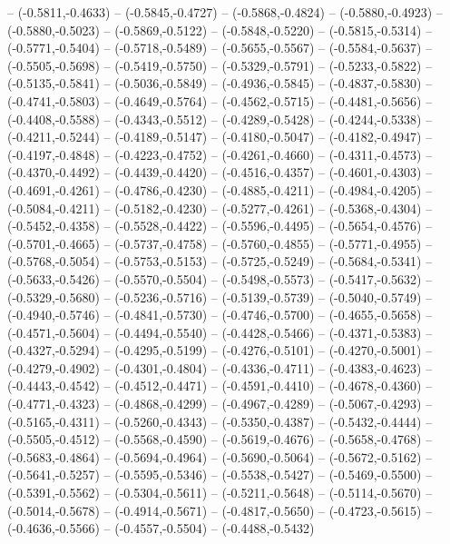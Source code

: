 {	-- (-0.5811,-0.4633)
	-- (-0.5845,-0.4727)
	-- (-0.5868,-0.4824)
	-- (-0.5880,-0.4923)
	-- (-0.5880,-0.5023)
	-- (-0.5869,-0.5122)
	-- (-0.5848,-0.5220)
	-- (-0.5815,-0.5314)
	-- (-0.5771,-0.5404)
	-- (-0.5718,-0.5489)
	-- (-0.5655,-0.5567)
	-- (-0.5584,-0.5637)
	-- (-0.5505,-0.5698)
	-- (-0.5419,-0.5750)
	-- (-0.5329,-0.5791)
	-- (-0.5233,-0.5822)
	-- (-0.5135,-0.5841)
	-- (-0.5036,-0.5849)
	-- (-0.4936,-0.5845)
	-- (-0.4837,-0.5830)
	-- (-0.4741,-0.5803)
	-- (-0.4649,-0.5764)
	-- (-0.4562,-0.5715)
	-- (-0.4481,-0.5656)
	-- (-0.4408,-0.5588)
	-- (-0.4343,-0.5512)
	-- (-0.4289,-0.5428)
	-- (-0.4244,-0.5338)
	-- (-0.4211,-0.5244)
	-- (-0.4189,-0.5147)
	-- (-0.4180,-0.5047)
	-- (-0.4182,-0.4947)
	-- (-0.4197,-0.4848)
	-- (-0.4223,-0.4752)
	-- (-0.4261,-0.4660)
	-- (-0.4311,-0.4573)
	-- (-0.4370,-0.4492)
	-- (-0.4439,-0.4420)
	-- (-0.4516,-0.4357)
	-- (-0.4601,-0.4303)
	-- (-0.4691,-0.4261)
	-- (-0.4786,-0.4230)
	-- (-0.4885,-0.4211)
	-- (-0.4984,-0.4205)
	-- (-0.5084,-0.4211)
	-- (-0.5182,-0.4230)
	-- (-0.5277,-0.4261)
	-- (-0.5368,-0.4304)
	-- (-0.5452,-0.4358)
	-- (-0.5528,-0.4422)
	-- (-0.5596,-0.4495)
	-- (-0.5654,-0.4576)
	-- (-0.5701,-0.4665)
	-- (-0.5737,-0.4758)
	-- (-0.5760,-0.4855)
	-- (-0.5771,-0.4955)
	-- (-0.5768,-0.5054)
	-- (-0.5753,-0.5153)
	-- (-0.5725,-0.5249)
	-- (-0.5684,-0.5341)
	-- (-0.5633,-0.5426)
	-- (-0.5570,-0.5504)
	-- (-0.5498,-0.5573)
	-- (-0.5417,-0.5632)
	-- (-0.5329,-0.5680)
	-- (-0.5236,-0.5716)
	-- (-0.5139,-0.5739)
	-- (-0.5040,-0.5749)
	-- (-0.4940,-0.5746)
	-- (-0.4841,-0.5730)
	-- (-0.4746,-0.5700)
	-- (-0.4655,-0.5658)
	-- (-0.4571,-0.5604)
	-- (-0.4494,-0.5540)
	-- (-0.4428,-0.5466)
	-- (-0.4371,-0.5383)
	-- (-0.4327,-0.5294)
	-- (-0.4295,-0.5199)
	-- (-0.4276,-0.5101)
	-- (-0.4270,-0.5001)
	-- (-0.4279,-0.4902)
	-- (-0.4301,-0.4804)
	-- (-0.4336,-0.4711)
	-- (-0.4383,-0.4623)
	-- (-0.4443,-0.4542)
	-- (-0.4512,-0.4471)
	-- (-0.4591,-0.4410)
	-- (-0.4678,-0.4360)
	-- (-0.4771,-0.4323)
	-- (-0.4868,-0.4299)
	-- (-0.4967,-0.4289)
	-- (-0.5067,-0.4293)
	-- (-0.5165,-0.4311)
	-- (-0.5260,-0.4343)
	-- (-0.5350,-0.4387)
	-- (-0.5432,-0.4444)
	-- (-0.5505,-0.4512)
	-- (-0.5568,-0.4590)
	-- (-0.5619,-0.4676)
	-- (-0.5658,-0.4768)
	-- (-0.5683,-0.4864)
	-- (-0.5694,-0.4964)
	-- (-0.5690,-0.5064)
	-- (-0.5672,-0.5162)
	-- (-0.5641,-0.5257)
	-- (-0.5595,-0.5346)
	-- (-0.5538,-0.5427)
	-- (-0.5469,-0.5500)
	-- (-0.5391,-0.5562)
	-- (-0.5304,-0.5611)
	-- (-0.5211,-0.5648)
	-- (-0.5114,-0.5670)
	-- (-0.5014,-0.5678)
	-- (-0.4914,-0.5671)
	-- (-0.4817,-0.5650)
	-- (-0.4723,-0.5615)
	-- (-0.4636,-0.5566)
	-- (-0.4557,-0.5504)
	-- (-0.4488,-0.5432)
}
